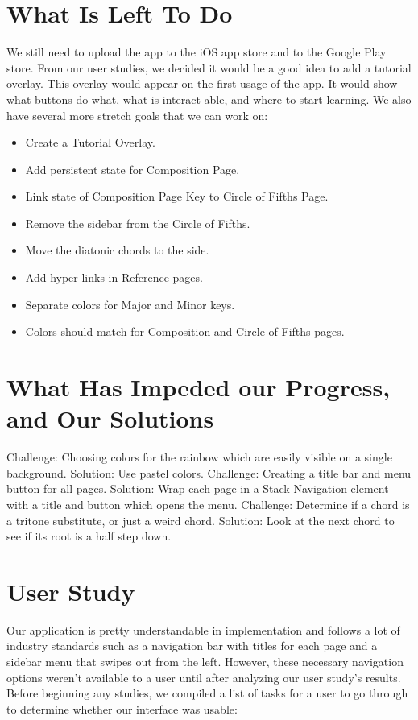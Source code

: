 \documentclass[onecolumn, draftclsnofoot,10pt, compsoc]{IEEEtran}
\begin{document}
\section{What Is Left To Do}
We still need to upload the app to the iOS app store and to the Google Play store.
From our user studies, we decided it would be a good idea to add a tutorial overlay.
This overlay would appear on the first usage of the app.
It would show what buttons do what, what is interact-able, and where to start learning.
We also have several more stretch goals that we can work on:

\begin{itemize}
\item Create a Tutorial Overlay.
\item Add persistent state for Composition Page.
\item Link state of Composition Page Key to Circle of Fifths Page.
\item Remove the sidebar from the Circle of Fifths.
\item Move the diatonic chords to the side.
\item Add hyper-links in Reference pages.
\item Separate colors for Major and Minor keys.
\item Colors should match for Composition and Circle of Fifths pages.
\end{itemize}

\section{What Has Impeded our Progress, and Our Solutions}

\begin{outline}
\1 Challenge: Choosing colors for the rainbow which are easily visible on a single background.
	\2	Solution: Use pastel colors.
\1 Challenge: Creating a title bar and menu button for all pages.
	\2 Solution: Wrap each page in a Stack Navigation element with a title and button which opens the menu.
\1 Challenge: Determine if a chord is a tritone substitute, or just a weird chord.
	\2 Solution: Look at the next chord to see if its root is a half step down.
\end{outline}

\section{User Study}
Our application is pretty understandable in implementation and follows a lot of industry standards such as a navigation bar with titles for each page and a sidebar menu that swipes out from the left. However, these necessary navigation options weren't available to a user until after analyzing our user study's results. Before beginning any studies, we compiled a list of tasks for a user to go through to determine whether our interface was usable:
\end{document}

